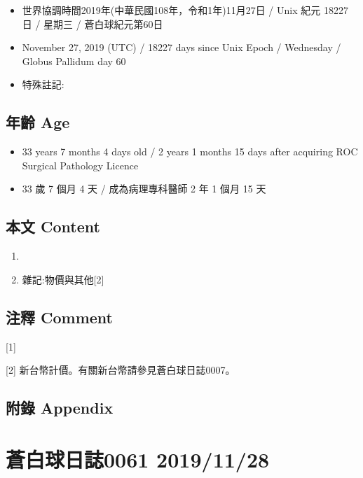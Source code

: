 \documentclass[
]{article}
\providecommand{\tightlist}{%
  \setlength{\itemsep}{0pt}\setlength{\parskip}{0pt}}
\begin{document}
\begin{itemize}
\tightlist
\item
  世界協調時間2019年(中華民國108年，令和1年)11月27日 / Unix 紀元 18227
  日 / 星期三 / 蒼白球紀元第60日
\item
  November 27, 2019 (UTC) / 18227 days since Unix Epoch / Wednesday /
  Globus Pallidum day 60
\item
  特殊註記:
\end{itemize}

\hypertarget{ux5e74ux9f61-age-26}{%
\subsection{年齡 Age}\label{ux5e74ux9f61-age-26}}

\begin{itemize}
\tightlist
\item
  33 years 7 months 4 days old / 2 years 1 months 15 days after
  acquiring ROC Surgical Pathology Licence
\item
  33 歲 7 個月 4 天 / 成為病理專科醫師 2 年 1 個月 15 天
\end{itemize}

\hypertarget{ux672cux6587-content-26}{%
\subsection{本文 Content}\label{ux672cux6587-content-26}}

\begin{enumerate}
\def\labelenumi{\arabic{enumi}.}
\item
\item
  雜記:物價與其他{[}2{]}
\end{enumerate}

\hypertarget{ux6ce8ux91cb-comment-26}{%
\subsection{注釋 Comment}\label{ux6ce8ux91cb-comment-26}}

{[}1{]}

{[}2{]} 新台幣計價。有關新台幣請參見蒼白球日誌0007。

\hypertarget{ux9644ux9304-appendix-26}{%
\subsection{附錄 Appendix}\label{ux9644ux9304-appendix-26}}

\hypertarget{ux84bcux767dux7403ux65e5ux8a8c0061-20191128}{%
\section{蒼白球日誌0061
2019/11/28}\label{ux84bcux767dux7403ux65e5ux8a8c0061-20191128}}
\end{document}

